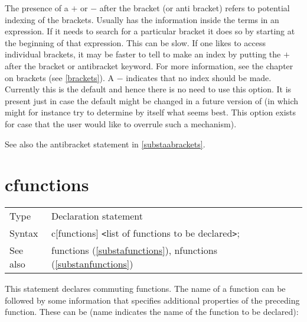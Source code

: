 \noindent The presence of a $+$ or $-$ after the bracket (or anti bracket) 
refers to potential indexing of the brackets. 
Usually {\FORM} has the information inside the terms in an expression. If 
it needs to search for a particular bracket it does so by starting at the 
beginning of that expression. This can be slow. If one likes to access 
individual brackets, it may be faster to tell {\FORM} to make an index by 
putting the $+$ after the bracket or antibracket keyword. For more 
information, see the chapter on brackets (see \ref{brackets}). A $-$ 
indicates that no index should be made. Currently this is the default and 
hence there is no need to use this option. It is present just in case the 
default might be changed in a future version of {\FORM} (in which {\FORM} 
might for instance try to determine by itself what seems best. This option 
exists for case that the user would like to overrule such a mechanism). 
\vspace{4mm}

\noindent See also the antibracket statement in \ref{substaabrackets}.
\vspace{10mm}


\section{cfunctions}
\label{substacfunctions}

\noindent \begin{tabular}{ll}
Type & Declaration statement\\
Syntax & c[functions] {\tt<}list of functions to be declared{\tt>}; \\
See also & functions (\ref{substafunctions}), nfunctions (\ref{substanfunctions})
\end{tabular} \vspace{4mm}

\noindent This statement declares commuting 
functions. The name of a 
function can be followed by some information that specifies additional 
properties of the preceding function. These can be (name indicates the 
name of the function to be declared): \vspace{4mm}



